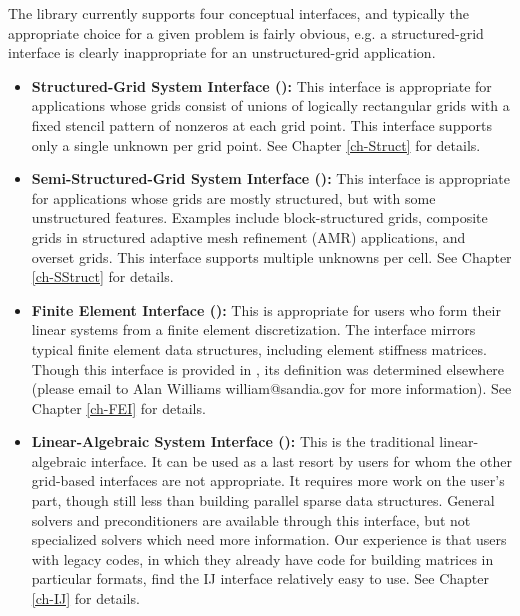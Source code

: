 The \hypre{} library currently supports four conceptual interfaces,
and typically the appropriate choice for a given problem is fairly
obvious, e.g. a structured-grid interface is clearly inappropriate for
an unstructured-grid application.


\begin{itemize}

\item
{\bf Structured-Grid System Interface ():} This interface is
appropriate for applications whose grids consist of unions of logically
rectangular grids with a fixed stencil pattern of nonzeros at each grid point.
This interface supports only a single unknown per grid point.  See Chapter
\ref{ch-Struct} for details.

\item
{\bf Semi-Structured-Grid System Interface ():} This
interface is appropriate for applications whose grids are mostly
structured, but with some unstructured features.  Examples include
block-structured grids, composite grids in structured adaptive mesh
refinement (AMR) applications, and overset grids.  This interface
supports multiple unknowns per cell. See Chapter \ref{ch-SStruct} for details.

\item
{\bf Finite Element Interface ():} This is appropriate for
users who form their linear systems from a finite element
discretization.  The interface mirrors typical finite element data
structures, including element stiffness matrices.  Though this
interface is provided in \hypre{}, its definition was determined
elsewhere (please email to Alan Williams william@sandia.gov for
more information). See Chapter \ref{ch-FEI} for details.

\item
{\bf Linear-Algebraic System Interface ():} This is the
traditional linear-algebraic interface.  It can be used as a last
resort by users for whom the other grid-based interfaces are not
appropriate.  It requires more work on the user's part, though still
less than building parallel sparse data structures.  General solvers
and preconditioners are available through this interface, but not
specialized solvers which need more information.  Our experience is
that users with legacy codes, in which they already have code for
building matrices in particular formats, find the IJ interface
relatively easy to use. See Chapter \ref{ch-IJ} for details.

\end{itemize}


